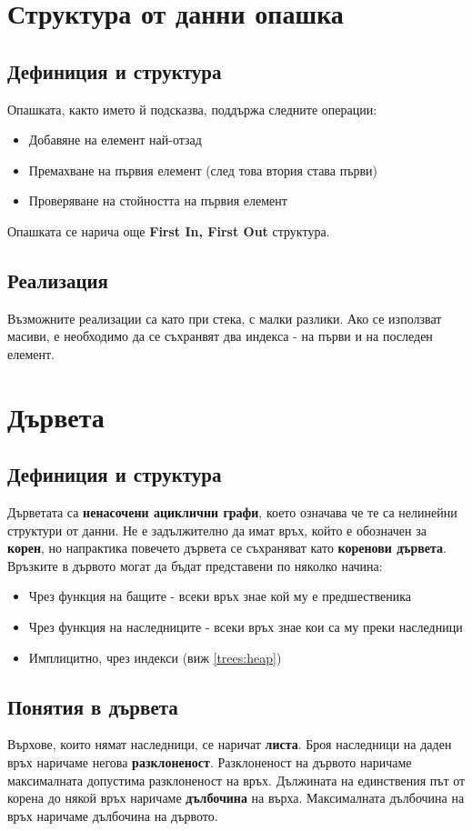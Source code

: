\documentclass[fleqn,12pt]{article}
\begin{document}
\section{Структура от данни опашка}
\subsection{Дефиниция и структура}
Опашката, както името й подсказва, поддържа следните операции:
\begin{itemize}
    \item Добавяне на елемент най-отзад
    \item Премахване на първия елемент (след това втория става първи)
    \item Проверяване на стойността на първия елемент
\end{itemize}

Опашката се нарича още \textbf{First In, First Out} структура.

\subsection{Реализация}
Възможните реализации са като при стека, с малки разлики. Ако се използват масиви, е необходимо да се съхранвят два индекса - на първи и на последен елемент.

\section{Дървета}
\subsection{Дефиниция и структура}
Дърветата са \textbf{ненасочени ациклични графи}, което означава че те са нелинейни структури от данни. Не е задължително да имат връх, който е обозначен за \textbf{корен}, но
напрактика повечето дървета се съхраняват като \textbf{коренови дървета}. Връзките в дървото могат да бъдат представени по няколко начина:
\begin{itemize}
    \item Чрез функция на бащите - всеки връх знае кой му е предшественика
    \item Чрез функция на наследниците - всеки връх знае кои са му преки наследници
    \item Имплицитно, чрез индекси (виж \ref{trees:heap})
\end{itemize}

\subsection{Понятия в дървета}
Върхове, които нямат наследници, се наричат \textbf{листа}. Броя наследници на даден връх наричаме негова \textbf{разклоненост}.
Разклоненост на дървото наричаме максималната допустима разклоненост на връх. Дължината на единствения път от корена до някой връх
наричаме \textbf{дълбочина} на върха. Максималната дълбочина на връх наричаме дълбочина на дървото.
\end{document}
